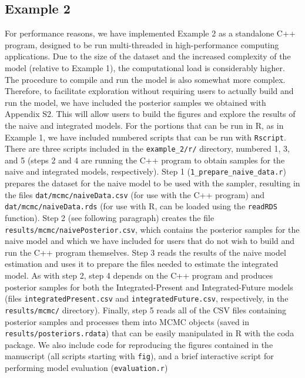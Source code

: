 \documentclass[11pt]{article}
\begin{document}
\subsection*{Example 2}
For performance reasons, we have implemented Example 2 as a standalone C++ program, designed to be run multi-threaded in high-performance computing applications.
Due to the size of the dataset and the increased complexity of the model (relative to Example 1), the computational load is considerably higher.
The procedure to compile and run the model is also somewhat more complex.
Therefore, to facilitate exploration without requiring users to actually build and run the model, we have included the posterior samples we obtained with Appendix S2.
This will allow users to build the figures and explore the results of the naive and integrated models.
For the portions that can be run in R, as in Example 1, we have included numbered scripts that can be run with {\tt Rscript}.
There are three scripts included in the {\tt example\_2/r/} directory, numbered 1, 3, and 5 (steps 2 and 4 are running the C++ program to obtain samples for the naive and integrated models, respectively).
Step 1 ({\tt 1\_prepare\_naive\_data.r}) prepares the dataset for the naive model to be used with the sampler, resulting in the files {\tt dat/mcmc/naiveData.csv} (for use with the C++ program) and {\tt dat/mcmc/naiveData.rds} (for use with R, can be loaded using the {\tt readRDS} function).
Step 2 (see following paragraph) creates the file {\tt results/mcmc/naivePosterior.csv}, which contains the posterior samples for the naive model and which we have included for users that do not wish to build and run the C++ program themselves.
Step 3 reads the results of the naive model estimation and uses it to prepare the files needed to estimate the integrated model.
As with step 2, step 4 depends on the C++ program and produces posterior samples for both the Integrated-Present and Integrated-Future models (files {\tt integratedPresent.csv} and {\tt integratedFuture.csv}, respectively, in the {\tt results/mcmc/} directory).
Finally, step 5 reads all of the CSV files containing posterior samples and processes them into MCMC objects (saved in {\tt results/posteriors.rdata}) that can be easily manipulated in R with the coda package.
We also include code for reproducing the figures contained in the manuscript (all scripts starting with {\tt fig}), and a brief interactive script for performing model evaluation ({\tt evaluation.r})
\end{document}
